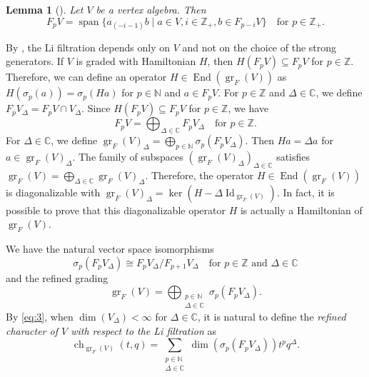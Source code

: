 \documentclass[a4paper, 12pt, reqno]{amsart}
\newtheorem{lemma}[theorem]{Lemma}
\theoremstyle{remark}
\DeclareMathOperator{\ch}{ch}
\DeclareMathOperator{\gr}{gr}
\DeclareMathOperator{\vspan}{span}
\DeclareMathOperator{\End}{End}
\DeclareMathOperator{\Id}{Id}
\begin{document}
\begin{lemma}[{\cite[Lemma 2.9]{li_abelianizing_2005}}]
  \label{lmm:3}
  Let $V$ be a vertex algebra.
  Then
  \begin{equation*}
    F_pV = \vspan\{a_{(-i - 1)}b \mid a \in V, i \in \mathbb{Z}_+, b \in F_{p - i}V\} \quad \text{for $p \in \mathbb{Z}_+$}.
  \end{equation*}
\end{lemma}

By , the Li filtration depends only on $V$ and not on the choice of the strong generators.
If $V$ is graded with Hamiltonian $H$, then $H(F_pV) \subseteq F_pV$ for $p \in \mathbb{Z}$.
Therefore, we can define an operator $H \in \End(\gr_F(V))$ as $H(\sigma_p(a)) = \sigma_p(Ha)$ for $p \in \mathbb{N}$ and $a \in F_pV$.
For $p \in \mathbb{Z}$ and $\Delta \in \mathbb{C}$, we define $F_pV_{\Delta} = F_pV \cap V_{\Delta}$.
Since $H(F_pV) \subseteq F_pV$ for $p \in \mathbb{Z}$, we have
\begin{equation*}
  F_pV = \bigoplus_{\Delta \in \mathbb{C}}F_pV_{\Delta} \quad \text{for $p \in \mathbb{Z}$}.
\end{equation*}
For $\Delta \in \mathbb{C}$, we define $\gr_F(V)_{\Delta} = \bigoplus_{p \in \mathbb{N}}\sigma_p(F_pV_{\Delta})$.
Then $Ha = \Delta a$ for $a \in \gr_F(V)_{\Delta}$.
The family of subspaces $(\gr_F(V)_{\Delta})_{\Delta \in \mathbb{C}}$ satisfies $\gr_F(V) = \bigoplus_{\Delta \in \mathbb{C}}\gr_F(V)_{\Delta}$.
Therefore, the operator $H \in \End(\gr_F(V))$ is diagonalizable with $\gr_F(V)_{\Delta} = \ker(H - \Delta\Id_{\gr_F(V)})$.
In fact, it is possible to prove that this diagonalizable operator $H$ is actually a Hamiltonian of $\gr_F(V)$.

We have the natural vector space isomorphisms
\begin{equation*}
  \sigma_p(F_pV_{\Delta}) \cong F_pV_{\Delta}/F_{p + 1}V_{\Delta} \quad \text{for $p \in \mathbb{Z}$ and $\Delta \in \mathbb{C}$}
\end{equation*}
and the refined grading
\begin{equation}
  \label{eq:3}
  \gr_F(V) = \bigoplus_{\substack{p \in \mathbb{N} \\ \Delta \in \mathbb{C}}}\sigma_p(F_pV_{\Delta}).
\end{equation}
By \eqref{eq:3}, when $\dim(V_{\Delta}) < \infty$ for $\Delta \in \mathbb{C}$, it is natural to define the \emph{refined character of $V$ with respect to the Li filtration} as
\begin{equation*}
  \ch_{\gr_F(V)}(t, q) = \sum_{\substack{p \in \mathbb{N} \\ \Delta \in \mathbb{C}}}\dim(\sigma_p(F_pV_{\Delta}))t^pq^{\Delta}.
\end{equation*}
\end{document}
